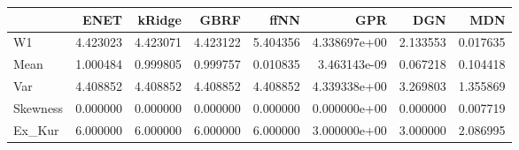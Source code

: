 \begin{tabular}{lrrrrrrr}
\toprule
{} &      ENET &    kRidge &      GBRF &      ffNN &           GPR &       DGN &       MDN \\
\midrule
W1       &  4.423023 &  4.423071 &  4.423122 &  5.404356 &  4.338697e+00 &  2.133553 &  0.017635 \\
Mean     &  1.000484 &  0.999805 &  0.999757 &  0.010835 &  3.463143e-09 &  0.067218 &  0.104418 \\
Var      &  4.408852 &  4.408852 &  4.408852 &  4.408852 &  4.339338e+00 &  3.269803 &  1.355869 \\
Skewness &  0.000000 &  0.000000 &  0.000000 &  0.000000 &  0.000000e+00 &  0.000000 &  0.007719 \\
Ex\_Kur   &  6.000000 &  6.000000 &  6.000000 &  6.000000 &  3.000000e+00 &  3.000000 &  2.086995 \\
\bottomrule
\end{tabular}
